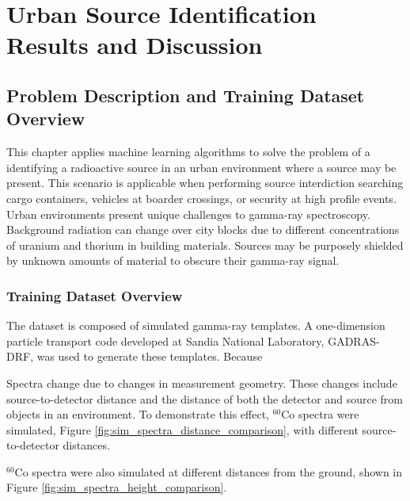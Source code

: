 \chapter{Urban Source Identification Results and Discussion}





\section{Problem Description and Training Dataset Overview}

This chapter applies machine learning algorithms to solve the problem of a identifying a radioactive source in an urban environment where a source may be present. This scenario is applicable when performing source interdiction searching cargo containers, vehicles at boarder crossings, or security at high profile events. Urban environments present unique challenges to gamma-ray spectroscopy. Background radiation can change over city blocks due to different concentrations of uranium and thorium in building materials. Sources may be purposely shielded by unknown amounts of material to obscure their gamma-ray signal.


\subsection{Training Dataset Overview}

The dataset is composed of simulated gamma-ray templates. A one-dimension particle transport code developed at Sandia National Laboratory, GADRAS-DRF, was used to generate these templates. Because 

Spectra change due to changes in measurement geometry. These changes include source-to-detector distance and the distance of both the detector and source from objects in an environment. To demonstrate this effect, $^{60}$Co spectra were simulated, Figure \ref{fig:sim_spectra_distance_comparison}, with different source-to-detector distances.

$^{60}$Co spectra were also simulated at different distances from the ground, shown in Figure \ref{fig:sim_spectra_height_comparison}.



